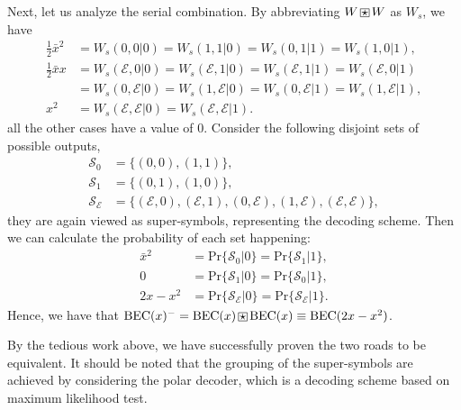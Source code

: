 \begin{example}
    Next, let us analyze the serial combination. By abbreviating $W\boxstar W$ as $W_s$, we have
    \begin{align*}
        \frac{1}{2}\bar{x}^2 &= W_s(0,0\vert0) = W_s(1,1\vert0) = W_s(0,1\vert1) = W_s(1,0\vert1), \\
        \frac{1}{2}\bar{x}x &= W_s(\mathcal{E},0\vert0) = W_s(\mathcal{E},1\vert0) = W_s(\mathcal{E},1\vert1) = W_s(\mathcal{E},0\vert1) \\
        &= W_s(0,\mathcal{E}\vert0) = W_s(1,\mathcal{E}\vert0) = W_s(0,\mathcal{E}\vert1) = W_s(1,\mathcal{E}\vert1), \\
        x^2 &= W_s(\mathcal{E},\mathcal{E}\vert0) = W_s(\mathcal{E},\mathcal{E}\vert1).
    \end{align*}
    all the other cases have a value of 0. Consider the following disjoint sets of possible outputs,
    \begin{align*}
        \mathcal{S}_0 &= \{(0,0),(1,1)\}, \\
        \mathcal{S}_1 &= \{(0,1),(1,0)\}, \\
        \mathcal{S}_\mathcal{E} &= \{(\mathcal{E},0),(\mathcal{E},1),(0,\mathcal{E}),(1,\mathcal{E}),(\mathcal{E},\mathcal{E})\},
    \end{align*}
    they are again viewed as super-symbols, representing the decoding scheme. Then we can calculate the probability of each set happening:
    \begin{align*}
        \bar{x}^2 &= \mathrm{Pr}\{\mathcal{S}_0\vert0\} = \mathrm{Pr}\{\mathcal{S}_1\vert1\},\\
        0 &= \mathrm{Pr}\{\mathcal{S}_1\vert0\} = \mathrm{Pr}\{\mathcal{S}_0\vert1\},\\
        2x-x^2 &= \mathrm{Pr}\{\mathcal{S}_\mathcal{E}\vert0\} = \mathrm{Pr}\{\mathcal{S}_\mathcal{E}\vert1\}.
    \end{align*}
    Hence, we have that $\mathrm{BEC}(x)^- = \mathrm{BEC}(x)\boxstar\mathrm{BEC}(x) \equiv \mathrm{BEC}(2x-x^2)$.
\end{example}

By the tedious work above, we have successfully proven the two roads to be equivalent. It should be noted that the grouping of the super-symbols are achieved by considering the polar decoder, which is a decoding scheme based on maximum likelihood test.

